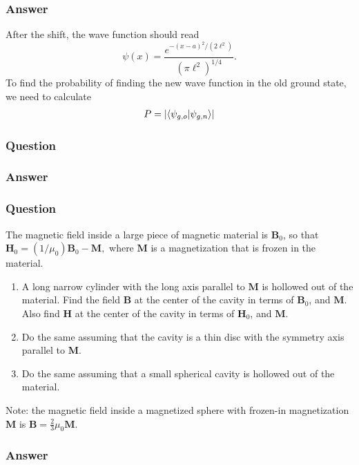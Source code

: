 \subsubsection{Answer}
After the shift, the wave function should read 
\begin{equation*}
	\psi(x) = \frac{e^{-(x-a)^2/(2\ell^2)}}{(\pi\ell^2)^{1/4}}.
\end{equation*}
To find the probability of finding the new wave function in the old ground state, we need to calculate
\begin{align}
	P = \abs{\braket{\psi_{g,o}}{\psi_{g,n}}}
\end{align}


\subsubsection{Question}
	
\subsubsection{Answer}


\subsubsection{Question}

The magnetic field inside a large piece of magnetic material is $\mathbf{B}_0$, so that $\mathbf{H}_0 = (1/\mu_0)\mathbf{B}_0 - \mathbf{M},$ where $\mathbf{M}$ is a magnetization that is frozen in the material.
\begin{enumerate}
	\item A long narrow cylinder with the long axis parallel to $\mathbf{M}$ is hollowed out of the material. Find the field $\mathbf{B}$ at the center of the cavity in terms of $\mathbf{B}_0$, and $\mathbf{M}$. Also find $\mathbf{H}$ at the center of the cavity in terms of $\mathbf{H}_0$, and $\mathbf{M}$.
	\item Do the same assuming that the cavity is a thin disc with the symmetry axis parallel to $\mathbf{M}$.
	\item Do the same assuming that a small spherical cavity is hollowed out of the material.
\end{enumerate}
Note: the magnetic field inside a magnetized sphere with frozen-in magnetization $\mathbf{M}$ is $\mathbf{B}=\frac{2}{3}\mu_0\mathbf{M}.$
\subsubsection{Answer}

